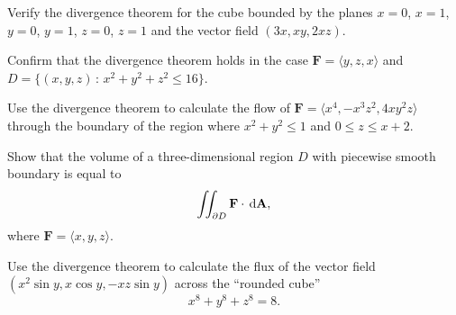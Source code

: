 \documentclass[svgnames]{watsonbook}
\begin{document}

\begin{aexercise}
  Verify the divergence theorem for the cube bounded by the planes
  $x=0$, $x=1$, $y=0$, $y=1$, $z=0$, $z=1$ and the vector field
  $(3x,xy,2xz)$.
\end{aexercise}

\begin{aexercise}
  Confirm that the divergence theorem holds in the case $\mathbf{F} =
  \langle y, z, x \rangle$ and $D = \{(x,y,z) \,: \, x^2 + y^2 + z^2
  \leq 16\}$. 
\end{aexercise}

\begin{aexercise}
  Use the divergence theorem to calculate the flow of $\mathbf{F} =
  \langle x^4, -x^3 z^2, 4xy^2 z \rangle$ through the boundary of the
  region where $x^2 + y^2 \leq 1$ and $0 \leq z
  \leq x + 2$. 
\end{aexercise}

\begin{aexercise}
  Show that the volume of a three-dimensional region $D$ with
  piecewise smooth boundary is equal to 
  \[
  \iint_{\partial D} \mathbf{F} \cdot \, {\mathrm{d}}\mathbf{A},
  \]
  where $\mathbf{F} =\langle x, y, z \rangle$. 
\end{aexercise}

\begin{aexercise}
  \begin{minipage}[t]{0.7\linewidth}
    Use the divergence theorem to calculate the flux of the vector
    field $(x^2 \sin y, x \cos y, -xz \sin y)$ across the ``rounded
    cube'' \[x^8 + y^8 + z^8 = 8.\]
  \end{minipage} 
  \begin{minipage}[t]{0.3\linewidth}
    \begin{center}
    \end{center}
  \end{minipage}
\end{aexercise}
\end{document}
